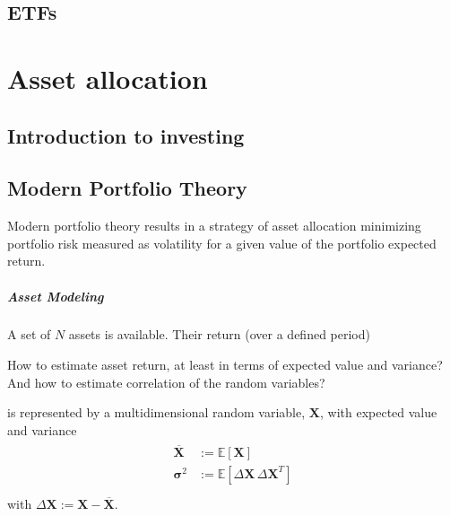 \documentclass[letterpaper,10pt,english]{jupyterBook}
\begin{document}
\sphinxstepscope


\chapter{ETFs}
\label{\detokenize{ch/assets/etfs:etfs}}\label{\detokenize{ch/assets/etfs:fin-edu-assets-etfs}}\label{\detokenize{ch/assets/etfs::doc}}
\sphinxstepscope


\part{Asset allocation}

\sphinxstepscope


\chapter{Introduction to investing}
\label{\detokenize{ch/investing/intro:introduction-to-investing}}\label{\detokenize{ch/investing/intro:fin-edu-investing-intro}}\label{\detokenize{ch/investing/intro::doc}}
\sphinxstepscope


\chapter{Modern Portfolio Theory}
\label{\detokenize{ch/investing/mpt:modern-portfolio-theory}}\label{\detokenize{ch/investing/mpt:fin-edu-investing-mpt}}\label{\detokenize{ch/investing/mpt::doc}}
\sphinxAtStartPar
Modern portfolio theory results in a strategy of asset allocation minimizing portfolio risk \sphinxhyphen{} measured as volatility \sphinxhyphen{} for a given value of the portfolio expected return.
\subsubsection*{Asset Modeling}

\sphinxAtStartPar
A set of \(N\) assets is available. Their return (over a defined period)%
\begin{footnote}[1]\sphinxAtStartFootnote
How to estimate asset return, at least in terms of expected value and variance? And how to estimate correlation of the random variables?
%
\end{footnote} is represented by a multi\sphinxhyphen{}dimensional random variable, \(\mathbf{X}\), with expected value and variance
\begin{equation*}
\begin{split}\begin{aligned}
  \overline{\mathbf{X}} & := \mathbb{E}\left[ \mathbf{X} \right] \\
  \boldsymbol{\sigma}^2 & := \mathbb{E}\left[ \Delta \mathbf{X} \, \Delta \mathbf{X}^T \right] \\
\end{aligned}\end{split}
\end{equation*}
\sphinxAtStartPar
with \(\Delta \mathbf{X} := \mathbf{X} - \overline{\mathbf{X}}\).
\end{document}
